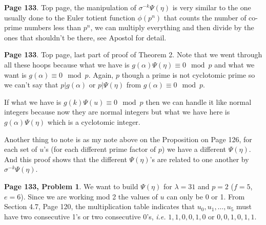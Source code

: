 \documentclass[aps,preprint,preprintnumbers,nofootinbib,showpacs,prd]{revtex4-1}
\newcommand{\ie}{{\it i.e.} }
\begin{document}
{\bf Page 133}. Top page, the manipulation of $\sigma^{-k}\Psi(\eta)$ is very similar to the one usually done to the Euler totient function $\phi(p^n)$ that counts the number of co-prime numbers less than $p^n$, we can multiply everything and then divide by the ones that shouldn't be there, see Apostol for detail.

{\bf Page 133}. Top page, last part of proof of Theorem 2. Note that we went through all these  hoops because what we have is $g(\alpha)\Psi(\eta) \equiv 0 \mod{p}$ and what we want is $g(\alpha) \equiv 0 \mod{p}$. Again, $p$ though a prime is not cyclotomic prime so we can't say that $p|g(\alpha)$ or $p|\Psi(\eta)$ from $g(\alpha) \equiv 0 \mod{p}$.

If what we have is $g(k)\Psi(u) \equiv 0 \mod{p}$ then we can handle it like normal integers because now they are normal integers but what we have here is $g(\alpha)\Psi(\eta)$ which is a cyclotomic integer.

Another thing to note is as my note above on the Proposition on Page 126, for each set of $u$'s (for each different prime factor of $p$) we have a different $\Psi(\eta)$. And this proof shows that the different $\Psi(\eta)$'s are related to one another by $\sigma^{-k}\Psi(\eta)$.

{\bf Page 133, Problem 1}. We want to build $\Psi(\eta)$ for $\lambda = 31$ and $p = 2$ ($f = 5$, $e = 6$). Since we are working mod 2 the values of $u$ can only be 0 or 1. From Section 4.7, Page 120, the multiplication table indicates that $u_0, u_1, \dots, u_5$ must have two consecutive 1's or two consecutive 0's, \ie $1,1,0,0,1,0$ or $0,0,1,0,1,1$.
\end{document}
